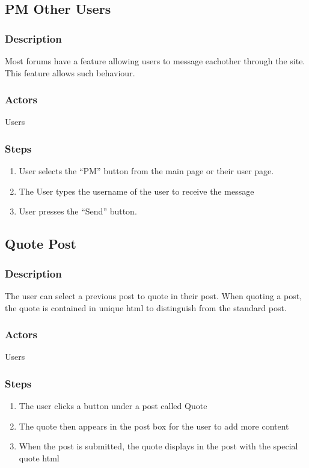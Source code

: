 \documentclass[12pt]{scrartcl}
\begin{document}
\subsection{PM Other Users}
\subsubsection{Description}

Most forums have a feature allowing users to message eachother through the site. This
feature allows such behaviour.

\subsubsection{Actors}

Users

\subsubsection{Steps}
\begin{enumerate}
\item User selects the ``PM'' button from the main page or their user page.
\item The User types the username of the user to receive the message
\item User presses the ``Send'' button.
\end{enumerate}

\subsection{Quote Post}
\subsubsection{Description}

The user can select a previous post to quote in their post. When quoting a post, the quote is contained in unique html to distinguish from the standard post. 
\subsubsection{Actors}

Users

\subsubsection{Steps}

\begin{enumerate}
\item The user clicks a button under a post called Quote
\item The quote then appears in the post box for the user to add more content
\item When the post is submitted, the quote displays in the post with the special quote html
\end{enumerate}
\end{document}
